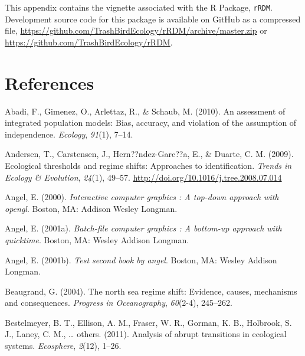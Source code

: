 \documentclass[12pt,twoside,openany]{reedthesis}
\begin{document}
This appendix contains the vignette associated with the R Package,
\texttt{rRDM}. Development source code for this package is available on
GitHub as a compressed file,
\url{https://github.com/TrashBirdEcology/rRDM/archive/master.zip} or
\url{https://github.com/TrashBirdEcology/rRDM}.

\backmatter

\chapter*{References}\label{references}


\noindent

\setlength{\parindent}{-0.20in} \setlength{\leftskip}{0.20in}
\setlength{\parskip}{8pt}

\hypertarget{refs}{}
\hypertarget{ref-abadi2010assessment}{}
Abadi, F., Gimenez, O., Arlettaz, R., \& Schaub, M. (2010). An
assessment of integrated population models: Bias, accuracy, and
violation of the assumption of independence. \emph{Ecology},
\emph{91}(1), 7--14.

\hypertarget{ref-andersen_ecological_2009}{}
Andersen, T., Carstensen, J., Hern??ndez-Garc??a, E., \& Duarte, C. M.
(2009). Ecological thresholds and regime shifts: Approaches to
identification. \emph{Trends in Ecology \& Evolution}, \emph{24}(1),
49--57. \url{http://doi.org/10.1016/j.tree.2008.07.014}

\hypertarget{ref-angel2000}{}
Angel, E. (2000). \emph{Interactive computer graphics : A top-down
approach with opengl}. Boston, MA: Addison Wesley Longman.

\hypertarget{ref-angel2001}{}
Angel, E. (2001a). \emph{Batch-file computer graphics : A bottom-up
approach with quicktime}. Boston, MA: Wesley Addison Longman.

\hypertarget{ref-angel2002a}{}
Angel, E. (2001b). \emph{Test second book by angel}. Boston, MA: Wesley
Addison Longman.

\hypertarget{ref-beaugrand2004north}{}
Beaugrand, G. (2004). The north sea regime shift: Evidence, causes,
mechanisms and consequences. \emph{Progress in Oceanography},
\emph{60}(2-4), 245--262.

\hypertarget{ref-bestelmeyer_analysis_2011}{}
Bestelmeyer, B. T., Ellison, A. M., Fraser, W. R., Gorman, K. B.,
Holbrook, S. J., Laney, C. M., \ldots{} others. (2011). Analysis of
abrupt transitions in ecological systems. \emph{Ecosphere},
\emph{2}(12), 1--26.
\end{document}

